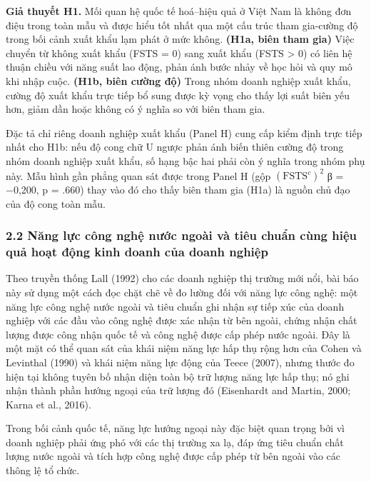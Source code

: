 \documentclass[12pt,a4paper]{article}
\begin{document}
\textbf{Giả thuyết H1.} Mối quan hệ quốc tế hoá--hiệu quả ở Việt Nam là
không đơn điệu trong toàn mẫu và được hiểu tốt nhất qua một cấu trúc
tham gia-cường độ trong bối cảnh xuất khẩu lạm phát ở mức không.
\textbf{(H1a, biên tham gia)} Việc chuyển từ không xuất khẩu (FSTS = 0)
sang xuất khẩu (FSTS \textgreater{} 0) có liên hệ thuận chiều với năng
suất lao động, phản ánh bước nhảy về học hỏi và quy mô khi nhập cuộc.
\textbf{(H1b, biên cường độ)} Trong nhóm doanh nghiệp xuất khẩu, cường
độ xuất khẩu trực tiếp bổ sung được kỳ vọng cho thấy lợi suất biên yếu
hơn, giảm dần hoặc không có ý nghĩa so với biên tham gia.

Đặc tả chỉ riêng doanh nghiệp xuất khẩu (Panel H) cung cấp kiểm định
trực tiếp nhất cho H1b: nếu độ cong chữ U ngược phản ánh biến thiên
cường độ trong nhóm doanh nghiệp xuất khẩu, số hạng bậc hai phải còn ý
nghĩa trong nhóm phụ này. Mẫu hình gần phẳng quan sát được trong Panel H
(gộp \((\mathrm{FSTS}^{c})^2\) β = −0,200, p = .660) thay vào đó cho
thấy biên tham gia (H1a) là nguồn chủ đạo của độ cong toàn mẫu.

\hypertarget{22-nux103ng-lux1ef1c-cuxf4ng-nghux1ec7-nux1b0ux1edbc-ngouxe0i-vuxe0-tiuxeau-chuux1ea9n-cuxf9ng-hiux1ec7u-quux1ea3-houx1ea1t-ux111ux1ed9ng-kinh-doanh-cux1ee7a-doanh-nghiux1ec7p}{%
\subsubsection{2.2 Năng lực công nghệ nước ngoài và tiêu chuẩn cùng hiệu
quả hoạt động kinh doanh của doanh
nghiệp}\label{22-nux103ng-lux1ef1c-cuxf4ng-nghux1ec7-nux1b0ux1edbc-ngouxe0i-vuxe0-tiuxeau-chuux1ea9n-cuxf9ng-hiux1ec7u-quux1ea3-houx1ea1t-ux111ux1ed9ng-kinh-doanh-cux1ee7a-doanh-nghiux1ec7p}}

Theo truyền thống Lall (1992) cho các doanh nghiệp thị trường mới nổi,
bài báo này sử dụng một cách đọc chặt chẽ về đo lường đối với năng lực
công nghệ: một năng lực công nghệ nước ngoài và tiêu chuẩn ghi nhận sự
tiếp xúc của doanh nghiệp với các đầu vào công nghệ được xác nhận từ bên
ngoài, chứng nhận chất lượng được công nhận quốc tế và công nghệ được
cấp phép nước ngoài. Đây là một mặt có thể quan sát của khái niệm năng
lực hấp thụ rộng hơn của Cohen và Levinthal (1990) và khái niệm năng lực
động của Teece (2007), nhưng thước đo hiện tại không tuyên bố nhận diện
toàn bộ trữ lượng năng lực hấp thụ; nó ghi nhận thành phần hướng ngoại
của trữ lượng đó (Eisenhardt and Martin, 2000; Karna et al., 2016).

Trong bối cảnh quốc tế, năng lực hướng ngoại này đặc biệt quan trọng bởi
vì doanh nghiệp phải ứng phó với các thị trường xa lạ, đáp ứng tiêu
chuẩn chất lượng nước ngoài và tích hợp công nghệ được cấp phép từ bên
ngoài vào các thông lệ tổ chức.
\end{document}
